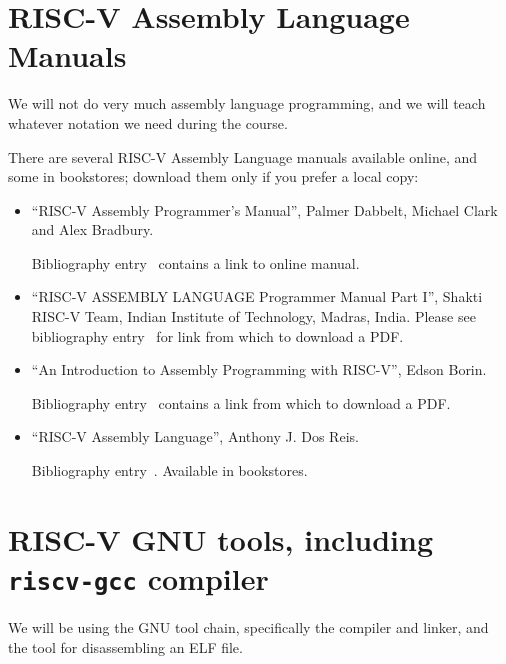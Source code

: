 
\section{RISC-V Assembly Language Manuals}

\label{apx_resources_asm_manuals}

We will not do very much assembly language programming, and we will
teach whatever notation we need during the course.

There are several RISC-V Assembly Language manuals available online,
and some in bookstores; download them only if you prefer a local copy:

\begin{itemize}

\item ``RISC-V Assembly Programmer's Manual'', 
    Palmer Dabbelt, Michael Clark and Alex Bradbury.

    Bibliography entry~\cite{Dabbelt2023} contains a link to online manual.

\item ``RISC-V ASSEMBLY LANGUAGE Programmer Manual Part I'', Shakti
    RISC-V Team, Indian Institute of Technology, Madras, India.
    Please see bibliography entry~\cite{Shakti_RISCV_ASM_Manual} for link
    from which to download a PDF.

\item ``An Introduction to Assembly Programming with RISC-V'', Edson Borin.

    Bibliography entry~\cite{Borin2021} contains a link
    from which to download a PDF.

\item ``RISC-V Assembly Language'',
    Anthony J. Dos Reis.

    Bibliography entry~\cite{DosReis2019}.  Available in bookstores.

\end{itemize}


\section{RISC-V GNU tools, including {\tt riscv-gcc} compiler}

\label{apx_resources_gnu_tools}

We will be using the GNU tool chain, specifically the {\gcc} compiler
and linker, and the {\objdump} tool for disassembling an ELF file.


